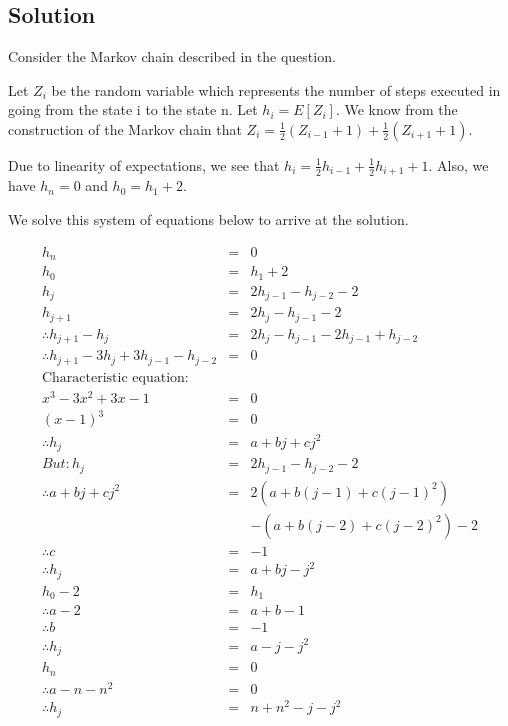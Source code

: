 \documentclass[10pt]{amsart}
\theoremstyle{remark}
\begin{document}
\subsection{Solution}
Consider the Markov chain described in the question.

Let $Z_{i}$ be the random variable which represents the number of steps executed in going from the state i to the state n. Let $h_{i}=E[Z_{i}]$. We know from the construction of the Markov chain that $Z_{i}=\frac{1}{2}(Z_{i-1}+1)+\frac{1}{2}(Z_{i+1}+1)$.

Due to linearity of expectations, we see that $h_{i}=\frac{1}{2}h_{i-1}+\frac{1}{2}h_{i+1} + 1$. Also, we have $h_{n}=0$ and $h_{0}=h_{1}+2$.

We solve this system of equations below to arrive at the solution.

\begin{eqnarray}
h_{n} &=& 0\\
h_{0} &=& h_{1}+2\\
h_{j} &=& 2h_{j-1}-h_{j-2}-2\\
h_{j+1} &=& 2h_{j}-h_{j-1}-2\\
\therefore  h_{j+1}-h_{j} &=& 2h_{j}-h_{j-1}-2h_{j-1}+h_{j-2}\\
\therefore  h_{j+1}-3h_{j}+3h_{j-1}-h_{j-2} &=& 0\\
\text{Characteristic equation:} && \\
x^{3}-3x^{2}+3x-1 &=& 0\\
(x-1)^{3} &=& 0\\
\therefore h_{j} &=& a+bj+cj^{2}\\
But: h_{j} &=& 2h_{j-1}-h_{j-2}-2\\
\therefore a+bj+cj^{2} &=& 2(a+b(j-1)+c(j-1)^{2}) \\
&& - (a+b(j-2)+c(j-2)^{2}) -2\\
\therefore c &=& -1\\
\therefore h_{j} &=& a+bj-j^{2}\\
h_{0} - 2 &=& h_{1}\\
\therefore a - 2 &=& a+b-1\\
\therefore b &=& -1\\
\therefore h_{j} &=& a-j-j^{2}\\
h_{n} &=& 0\\
\therefore a-n-n^{2} &=& 0\\
\therefore h_{j} &=& n+n^{2}-j-j^{2}\\
\end{eqnarray} 
\end{document}
